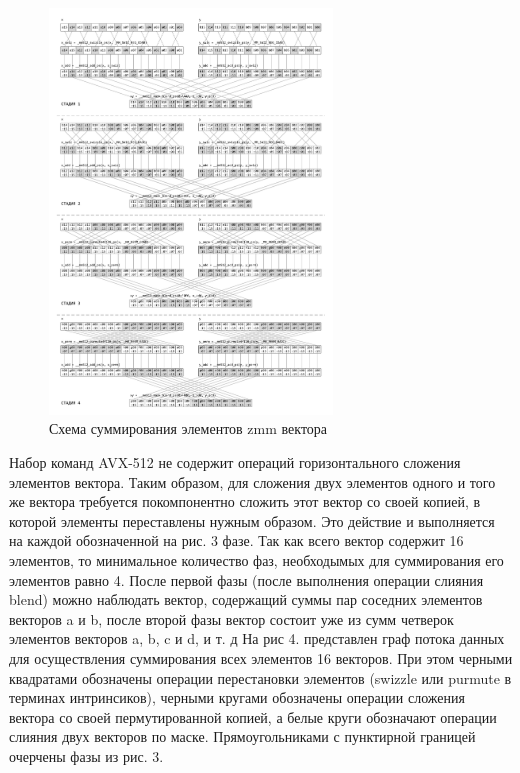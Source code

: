 \begin{figure}[ht]
	\centering
		\includegraphics[width=0.67\textwidth]{./pics/text_4_small_matr/horizontal_add.pdf}
	\caption{Схема суммирования элементов zmm вектора}
	\label{fig:text_4_small_matr_horizontal_add}
\end{figure}

Набор команд AVX-512 не содержит операций горизонтального сложения элементов вектора.
Таким образом, для сложения двух элементов одного и того же вектора требуется покомпонентно сложить этот вектор со своей копией, в которой элементы переставлены нужным образом.
Это действие и выполняется на каждой обозначенной на рис. 3 фазе.
Так как всего вектор содержит 16 элементов, то минимальное количество фаз, необходымых для суммирования его элементов равно 4.
После первой фазы (после выполнения операции слияния blend) можно наблюдать вектор, содержащий суммы пар соседних элементов векторов a и b, после второй фазы вектор состоит уже из сумм четверок элементов векторов a, b, c и d, и т. д
На рис 4. представлен граф потока данных для осуществления суммирования всех элементов 16 векторов.
При этом черными квадратами обозначены операции перестановки элементов (swizzle или purmute в терминах интринсиков), черными кругами обозначены операции сложения вектора со своей пермутированной копией, а белые круги обозначают операции слияния двух векторов по маске.
Прямоугольниками с пунктирной границей очерчены фазы из рис. 3.

